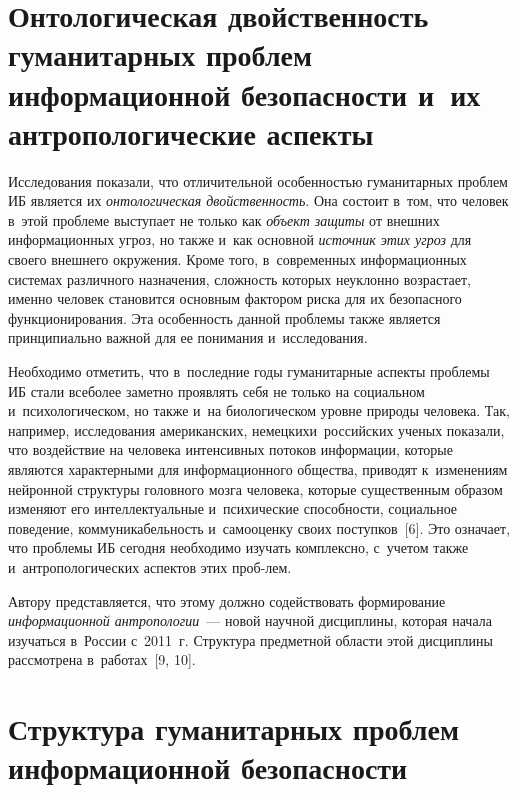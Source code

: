 \begin{multicols}{2}
\vspace*{-7pt}

\section{Онтологическая двойственность гуманитарных проблем 
информационной безопасности и~их антропологические аспекты}

\vspace*{-2pt}

   Исследования показали, что отличительной особенностью гуманитарных 
проблем ИБ является их \textit{онтологическая 
двойственность}. Она состоит в~том, что человек в~этой проблеме выступает 
не только как \textit{объект защиты} от внешних информационных угроз, но 
также и~как основной \textit{источник этих угроз} для своего внешнего 
окружения. 
   Кроме того, в~современных информационных сис\-те\-мах различного 
назначения, слож\-ность которых неуклонно возрастает, именно человек 
становится основным фактором риска для их безопасного 
функционирования. Эта особенность данной проб\-ле\-мы также является 
принципиально важной для ее понимания и~исследования.
   
   Необходимо отметить, что в~последние годы гуманитарные аспекты 
проблемы ИБ стали все\linebreak более заметно проявлять 
себя не только на социальном и~психологическом, но также и~на 
биологическом уровне природы человека. Так, например, исследования 
американских, немецких\linebreak и~российских ученых показали, что воздействие на 
человека интенсивных потоков информации, которые являются 
характерными для информационного общества, приводят к~изменениям 
нейронной структуры головного мозга человека, которые существенным 
образом изменяют его интеллектуальные и~психические способности, 
социальное поведение, коммуникабельность и~самооценку своих 
поступков~[6].
   Это означает, что проблемы ИБ сегодня 
необходимо изучать комплексно, с~учетом также и~антропологических 
аспектов этих проб-\linebreak лем. 
   
   Автору представляется, что этому должно содействовать формирование 
\textit{информационной антропологии}~--- новой научной дисциплины, 
которая начала изучаться в~России с~2011~г. Структура предметной 
области этой дисциплины рассмотрена в~работах~[9, 10].

\section{Структура гуманитарных проблем информационной 
безопасности}
   

\end{multicols}
